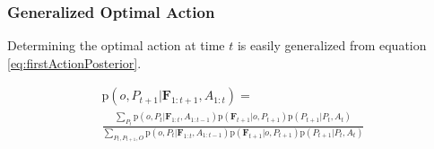 \documentclass[conference]{IEEEtran}
\newcommand{\prob}[1]{\text{p}(#1)} %
\newcommand{\set}[1]{\mathbf{#1}} %
\begin{document}
    \subsubsection{Generalized Optimal Action}
        Determining the optimal action at time $t$ is easily generalized from equation \ref{eq:firstActionPosterior}.










        \begin{multline}
            \label{eq:fullPosterior}
            \prob{o,P_{t+1}|\set{F}_{1:t+1},A_{1:t}} = \\ \frac{ \sum_{P_t} \prob{o,P_t|\set{F}_{1:t},A_{1:t-1}} \prob{\set{F}_{t+1}|o,P_{t+1}} \prob{P_{t+1}|P_t,A_t}}{\sum_{P_t,P_{t+1},O} \prob{o,P_t|\set{F}_{1:t},A_{1:t-1}} \prob{\set{F}_{t+1}|o,P_{t+1}} \prob{P_{t+1}|P_t,A_t}}
        \end{multline}
\end{document}
